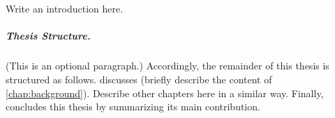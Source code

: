 \chapter{\introductionname}
\label{chap:introduction}

Write an introduction here.


%
\paragraph{Thesis Structure.} %
%

(This is an optional paragraph.)
%
Accordingly, the remainder of this thesis is structured as follows.
%
 discusses (briefly describe the content of \cref{chap:background}).
%
Describe other chapters here in a similar way.
%
Finally,  concludes this thesis by summarizing its main contribution.